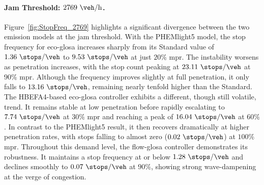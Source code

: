 \paragraph{Jam Threshold: $2769~\unit{\veh\per\hour}$.}
Figure~\vref{fig:StopFreq_2769} highlights a significant divergence between the two emission models at the jam threshold. With the PHEMlight5 model, the stop frequency for \ac{eco-glosa} increases sharply from its Standard value of $1.36~\unit{\stops\per\veh}$ to $9.53~\unit{\stops\per\veh}$ at just $20\%$ \ac{mpr}. The instability worsens as penetration increases, with the stop count peaking at $23.11~\unit{\stops\per\veh}$ at $90\%$ \ac{mpr}. Although the frequency improves slightly at full penetration, it only falls to $13.16~\unit{\stops\per\veh}$, remaining nearly tenfold higher than the Standard.
\mynewline
The HBEFA4-based \ac{eco-glosa} controller exhibits a different, though still volatile, trend. It remains stable at low penetration before rapidly escalating to $7.74~\unit{\stops\per\veh}$ at $30\%$ \ac{mpr} and reaching a peak of $16.04~\unit{\stops\per\veh}$ at $60\%$. In contrast to the PHEMlight5 result, it then recovers dramatically at higher penetration rates, with stops falling to almost zero ($0.02~\unit{\stops\per\veh}$) at $100\%$ \ac{mpr}.
\mynewline
Throughout this demand level, the \ac{flow-glosa} controller demonstrates its robustness. It maintains a stop frequency at or below $1.28~\unit{\stops\per\veh}$ and declines smoothly to $0.07~\unit{\stops\per\veh}$ at $90\%$, showing strong wave-dampening at the verge of congestion.


